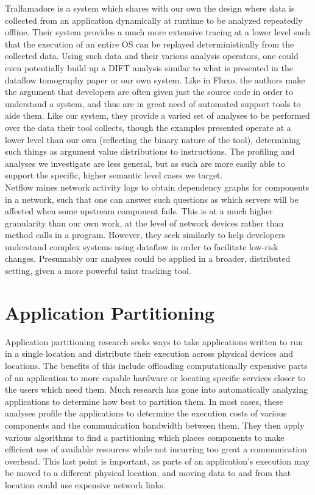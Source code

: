 \documentclass[msc,oneside]{ubcthesis}
\begin{document}
	Tralfamadore \cite{Lefebvre2012} is a system which shares with our own the design where data is collected from an application dynamically at runtime to be analyzed repeatedly offline. Their system provides a much more extensive tracing at a lower level such that the execution of an entire OS can be replayed deterministically from the collected data. Using such data and their various analysis operators, one could even potentially build up a DIFT analysis similar to what is presented in the dataflow tomography paper or our own system. Like in Fluxo, the authors make the argument that developers are often given just the source code in order to understand a system, and thus are in great need of automated support tools to aide them. Like our system, they provide a varied set of analyses to be performed over the data their tool collects, though the examples presented operate at a lower level than our own (reflecting the binary nature of the tool), determining such things as argument value distributions to instructions. The profiling and analyses we investigate are less general, but as such are more easily able to support the specific, higher semantic level cases we target.\\
	
	Netflow \cite{Caracas2008} mines network activity logs to obtain dependency graphs for components in a network, such that one can answer such questions as which servers will be affected when some upstream component fails. This is at a much higher granularity than our own work, at the level of network devices rather than method calls in a program. However, they seek similarly to help developers understand complex systems using dataflow in order to facilitate low-risk changes. Presumably our analyses could be applied in a broader, distributed setting, given a more powerful taint tracking tool.

\section{Application Partitioning}

	Application partitioning research seeks ways to take applications written to run in a single location and distribute their execution across physical devices and locations. The benefits of this include offloading computationally expensive parts of an application to more capable hardware or locating specific services closer to the users which need them. Much research has gone into automatically analyzing applications to determine how best to partition them. In most cases, these analyses profile the applications to determine the execution costs of various components and the communication bandwidth between them. They then apply various algorithms to find a partitioning which places components to make efficient use of available resources while not incurring too great a communication overhead. This last point is important, as parts of an application's execution may be moved to a different physical location, and moving data to and from that location could use expensive network links.\\
	
\end{document}
